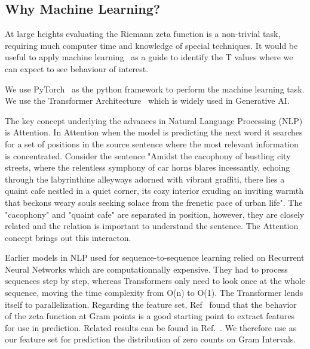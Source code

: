 \documentclass[twoside]{article}
\begin{document}
\subsection{\label{secwhy}Why Machine Learning?}

At large heights evaluating the Riemann zeta function  is a non-trivial task, requiring much computer time 
and knowledge of special techniques.  It would be useful to apply
machine learning~\cite{osneural,Shanker 2018a}
as a guide to identify the T values where we can expect to see behaviour of interest.

We use PyTorch~\cite{pytorch} as the python framework to perform the machine learning 
task. We use the Transformer Architecture~\cite{vaswani} which is widely used in Generative AI. 

The key concept underlying the advances in Natural Language Processing (NLP) is Attention. In Attention when the model is predicting the next word it searches for a set of positions in the source sentence where the most relevant information is concentrated. 
Consider the sentence "Amidst the cacophony of bustling city streets, where the relentless symphony of car horns blares incessantly, echoing through the labyrinthine alleyways adorned with vibrant graffiti, there lies a quaint cafe nestled in a quiet corner, its cozy interior exuding an inviting warmth that beckons weary souls seeking solace from the frenetic pace of urban life". The "cacophony" and "quaint cafe" are separated in position, however, they are closely related and the relation is important to understand the sentence. The Attention concept brings out this interacton.

Earlier models in NLP used for sequence-to-sequence learning relied on Recurrent Neural Networks which are computationnally expensive. They had to process sequences step by step, whereas Transformers only need to look once at the whole sequence, moving the time complexity from O(n) to O(1). The Transformer lends itself to parallelization. 
Regarding the feature set, 
Ref~\cite{osneural,Shanker 2018a} found that the behavior of the zeta function at Gram points 
is a good starting point to extract features for use in prediction. 
Related  results can be found in Ref.~\cite{oscue, os6, Shanker 2018b,Shanker 2020}. We therefore
use as our feature set for prediction the distribution of zero counts on Gram Intervals.
\end{document}
